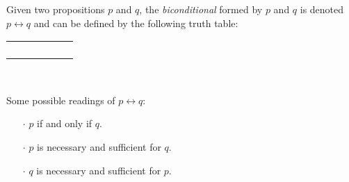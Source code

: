 \begin{definition}
    \begin{center}
        \begin{minipage}[t]{.55\linewidth}
            Given two propositions \(p\) and \(q\), the \emph{biconditional} formed by \(p\) and \(q\)
            is denoted \(p \leftrightarrow q\) and can be defined by the following truth table:
            \begin{table}[H]
                \centering
                \label{tab:iff}
                \begin{tabular}{|CcCc||Cc|} \hline
                     &  &  \\ \hline
                    \thead{\(\top\)} & \thead{\(\top\)} &  \\
                    \thead{\(\top\)} & \thead{\(\bot\)} &  \\
                    \thead{\(\bot\)} & \thead{\(\top\)} &  \\
                    \thead{\(\bot\)} & \thead{\(\bot\)} &  \\ \hline
                \end{tabular}
            \end{table}
        \end{minipage}%
        \begin{minipage}[t]{.05\linewidth}
            ~
        \end{minipage}%
        \begin{minipage}[t]{.4\linewidth}
            Some possible readings of \(p \leftrightarrow q\):\\
            \begin{itemize}
                \item[\(\cdot\)]
                    \(p\) if and only if \(q\).
                \item[\(\cdot\)]
                    \(p\) is necessary and sufficient for \(q\).
                \item[\(\cdot\)]
                    \(q\) is necessary and sufficient for \(p\).
            \end{itemize}
        \end{minipage}
    \end{center}
\end{definition}

